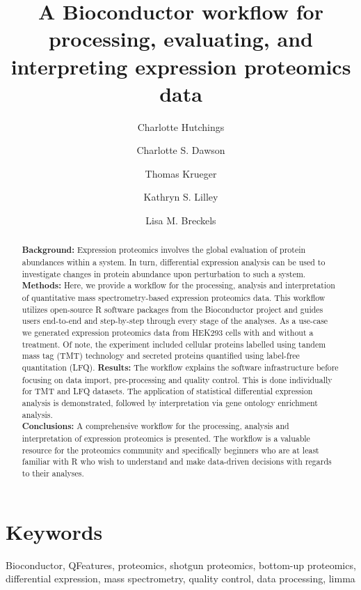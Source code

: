 \documentclass[9pt,a4paper,]{extarticle}
\begin{document}
\pagestyle{front}

\title{A Bioconductor workflow for processing, evaluating, and interpreting expression proteomics data}

\author[1]{Charlotte Hutchings}
\author[1]{Charlotte S. Dawson}
\author[2]{Thomas Krueger}
\author[1]{Kathryn S. Lilley}
\author[1]{Lisa M. Breckels}

\maketitle
\thispagestyle{front}

\begin{abstract}
\hfill\break
\textbf{Background:} Expression proteomics involves the global evaluation of protein
abundances within a system. In turn, differential expression analysis can be
used to investigate changes in protein abundance upon perturbation to such a
system.\\
\textbf{Methods:} Here, we provide a workflow for the processing, analysis and
interpretation of quantitative mass spectrometry-based expression proteomics
data. This workflow utilizes open-source R software packages from the
Bioconductor project and guides users end-to-end and step-by-step through every
stage of the analyses. As a use-case we generated expression proteomics data
from HEK293 cells with and without a treatment. Of note, the experiment included
cellular proteins labelled using tandem mass tag (TMT) technology and secreted
proteins quantified using label-free quantitation (LFQ).
\textbf{Results:} The workflow explains the software infrastructure before focusing
on data import, pre-processing and quality control. This is done individually
for TMT and LFQ datasets. The application of statistical differential
expression analysis is demonstrated, followed by interpretation via gene
ontology enrichment analysis.\\
\textbf{Conclusions:} A comprehensive workflow for the processing, analysis and
interpretation of expression proteomics is presented. The workflow is a
valuable resource for the proteomics community and specifically beginners who
are at least familiar with R who wish to understand and make data-driven
decisions with regards to their analyses.
\end{abstract}

\section*{Keywords}
Bioconductor, QFeatures, proteomics, shotgun proteomics, bottom-up proteomics,
differential expression, mass spectrometry, quality control, data processing,
limma
\end{document}
